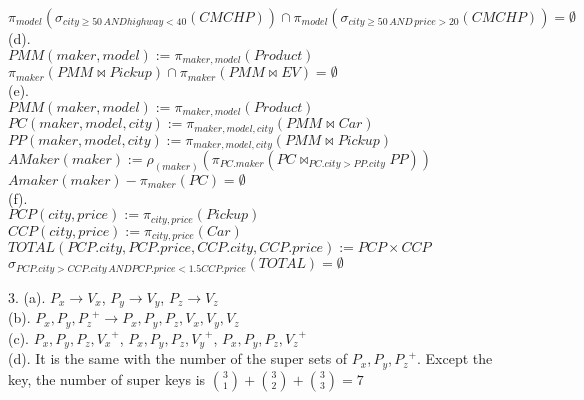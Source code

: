 \documentclass[12pt]{article}
\begin{document}
$\pi_{model}(\sigma_{city \geqslant 50 \, AND highway<40}(CMCHP)) \cap \pi_{model}(\sigma_{city \geqslant 50 \, AND \, price>20}(CMCHP))=\emptyset$\\
(d). \\
$PMM(maker,model):=\pi_{maker,model}(Product)$\\
$\pi_{maker}(PMM \bowtie Pickup) \cap \pi_{maker}(PMM \bowtie EV)=\emptyset $\\
(e).\\
 $PMM(maker,model):=\pi_{maker,model}(Product)$\\
 $PC(maker,model,city):=\pi_{maker,model,city}(PMM \bowtie Car)$\\
 $PP(maker,model,city):= \pi_{maker,model,city}(PMM \bowtie Pickup)$\\
 $AMaker(maker):=\rho_{(maker)}(\pi_{PC.maker}(PC \bowtie_{PC.city>PP.city} PP))$\\
 $Amaker(maker)-\pi_{maker}(PC)=\emptyset$\\
 (f). \\
 $PCP(city,price):=\pi_{city,price}(Pickup)$\\
 $CCP(city,price):=\pi_{city,price}(Car)$\\
 $TOTAL(PCP.city,PCP.price,CCP.city,CCP.price):=PCP \times CCP$\\
 $\sigma_{PCP.city>CCP.city \, AND PCP.price<1.5CCP.price}(TOTAL)=\emptyset $\\
 \par
 3.
 (a). $P_{x} \to V_{x}$, $P_{y} \to V_{y}$, $P_{z} \to V_{z}$\\
 (b). ${P_{x},P_{y} ,P_{z} }^{+} \to {P_{x},P_{y} ,P_{z}, V_{x}, V_{y}, V_{z}}$\\
 (c). ${P_{x},P_{y} ,P_{z}, V_{x} }^{+}$, ${P_{x},P_{y} ,P_{z}, V_{y} }^{+}$, ${P_{x},P_{y} ,P_{z}, V_{z} }^{+}$\\
 (d). It is the same with the number of the super sets of ${P_{x},P_{y} ,P_{z} }^{+}$. Except the key, the number of super keys is $\binom{3}{1}+\binom{3}{2}+\binom{3}{3}=7$
\end{document}
